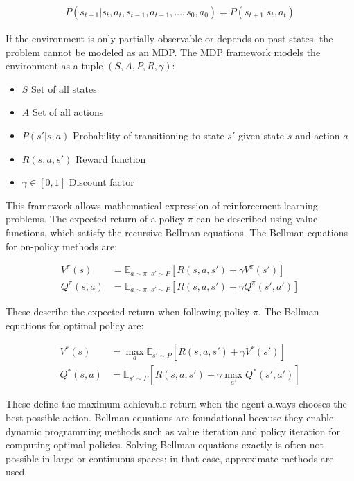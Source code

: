 \begin{align}
P(s_{t+1} | s_t, a_t, s_{t-1}, a_{t-1}, \dots, s_0, a_0) = P(s_{t+1} | s_t, a_t)
\end{align}

\noindent
If the environment is only partially observable or depends on past states, the problem cannot be modeled as an MDP. The MDP framework models the environment as a tuple \( (S, A, P, R, \gamma) \):

\begin{itemize}
\item \( S \) Set of all states
\item \( A \) Set of all actions
\item \( P(s' | s, a) \) Probability of transitioning to state \( s' \) given state \( s \) and action \( a \)
\item \( R(s, a, s') \) Reward function
\item \( \gamma \in [0,1] \) Discount factor
\end{itemize}

\noindent
This framework allows mathematical expression of reinforcement learning problems. The expected return of a policy \( \pi \) can be described using value functions, which satisfy the recursive Bellman equations. The Bellman equations for on-policy methods are:

\begin{align}
  V^\pi(s) &= \mathbb{E}_{a \sim \pi,\, s' \sim P} \left[ R(s, a, s') + \gamma V^\pi(s') \right] \\
  Q^\pi(s, a) &= \mathbb{E}_{a \sim \pi,\, s' \sim P} \left[ R(s, a, s') + \gamma Q^\pi(s', a') \right]
\end{align}

\noindent
These describe the expected return when following policy \( \pi \). The Bellman equations for optimal policy are:

\begin{align}
  V^*(s) &= \max_a \mathbb{E}_{s' \sim P} \left[ R(s, a, s') + \gamma V^*(s') \right] \\
  Q^*(s, a) &= \mathbb{E}_{s' \sim P} \left[ R(s, a, s') + \gamma \max_{a'} Q^*(s', a') \right]
\end{align}

\noindent
These define the maximum achievable return when the agent always chooses the best possible action. Bellman equations are foundational because they enable dynamic programming methods such as value iteration and policy iteration for computing optimal policies. Solving Bellman equations exactly is often not possible in large or continuous spaces; in that case, approximate methods are used.

